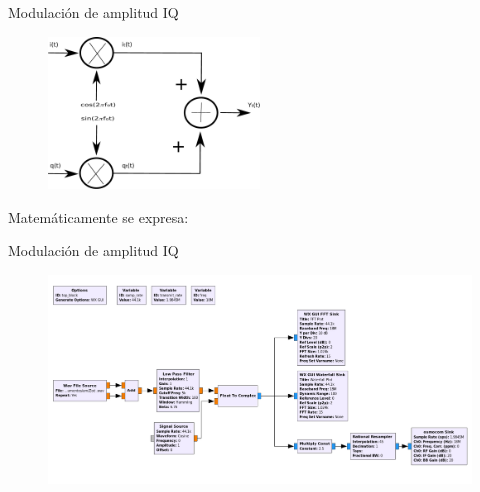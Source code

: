 \begin{frame}{Modulación de amplitud IQ}
\begin{figure}
    \centering
    \includegraphics[width=0.5\textwidth]{parte3/lab15/pdf/lab15_1.pdf}
\end{figure}


Matemáticamente se expresa: \\\vspace{3mm}

\end{frame}

\begin{frame}{Modulación de amplitud IQ}

\begin{figure}[H]
\centering
\vspace{-3mm}
\includegraphics[width=\textwidth]{parte3/lab15/pdf/lab15_2.pdf}
\end{figure}

\end{frame}

